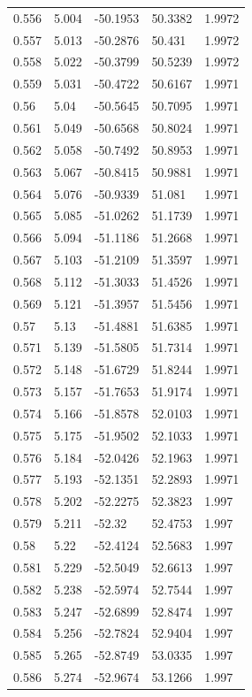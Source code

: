\begin{tabular}{lllll}
0.556 & 5.004 & -50.1953 & 50.3382 & 1.9972 \\
0.557 & 5.013 & -50.2876 & 50.431 & 1.9972 \\
0.558 & 5.022 & -50.3799 & 50.5239 & 1.9972 \\
0.559 & 5.031 & -50.4722 & 50.6167 & 1.9971 \\
0.56 & 5.04 & -50.5645 & 50.7095 & 1.9971 \\
0.561 & 5.049 & -50.6568 & 50.8024 & 1.9971 \\
0.562 & 5.058 & -50.7492 & 50.8953 & 1.9971 \\
0.563 & 5.067 & -50.8415 & 50.9881 & 1.9971 \\
0.564 & 5.076 & -50.9339 & 51.081 & 1.9971 \\
0.565 & 5.085 & -51.0262 & 51.1739 & 1.9971 \\
0.566 & 5.094 & -51.1186 & 51.2668 & 1.9971 \\
0.567 & 5.103 & -51.2109 & 51.3597 & 1.9971 \\
0.568 & 5.112 & -51.3033 & 51.4526 & 1.9971 \\
0.569 & 5.121 & -51.3957 & 51.5456 & 1.9971 \\
0.57 & 5.13 & -51.4881 & 51.6385 & 1.9971 \\
0.571 & 5.139 & -51.5805 & 51.7314 & 1.9971 \\
0.572 & 5.148 & -51.6729 & 51.8244 & 1.9971 \\
0.573 & 5.157 & -51.7653 & 51.9174 & 1.9971 \\
0.574 & 5.166 & -51.8578 & 52.0103 & 1.9971 \\
0.575 & 5.175 & -51.9502 & 52.1033 & 1.9971 \\
0.576 & 5.184 & -52.0426 & 52.1963 & 1.9971 \\
0.577 & 5.193 & -52.1351 & 52.2893 & 1.9971 \\
0.578 & 5.202 & -52.2275 & 52.3823 & 1.997 \\
0.579 & 5.211 & -52.32 & 52.4753 & 1.997 \\
0.58 & 5.22 & -52.4124 & 52.5683 & 1.997 \\
0.581 & 5.229 & -52.5049 & 52.6613 & 1.997 \\
0.582 & 5.238 & -52.5974 & 52.7544 & 1.997 \\
0.583 & 5.247 & -52.6899 & 52.8474 & 1.997 \\
0.584 & 5.256 & -52.7824 & 52.9404 & 1.997 \\
0.585 & 5.265 & -52.8749 & 53.0335 & 1.997 \\
0.586 & 5.274 & -52.9674 & 53.1266 & 1.997 \\

\end{tabular}
